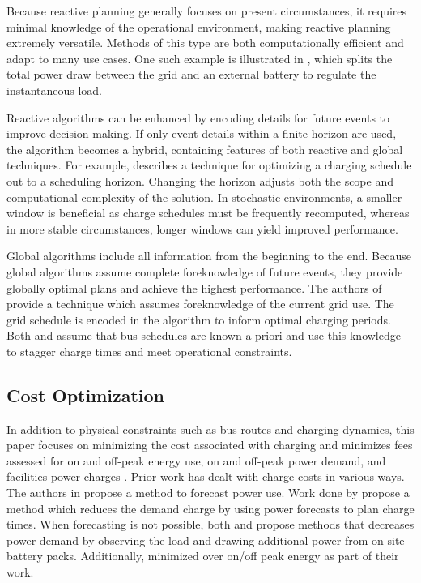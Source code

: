 \par Because reactive planning generally focuses on present circumstances, it requires minimal knowledge of the operational environment, making reactive planning extremely versatile.  Methods of this type are both computationally efficient and adapt to many use cases.  One such example is illustrated in \cite{cheng_smart_2020}, which splits the total power draw between the grid and an external battery to regulate the instantaneous load.
\par Reactive algorithms can be enhanced by encoding details for future events to improve decision making. If only event details within a finite horizon are used, the algorithm becomes a hybrid, containing features of both reactive and global techniques. For example, \cite{bagherinezhad_spatio-temporal_2020} describes a technique for optimizing a charging schedule out to a scheduling horizon. Changing the horizon adjusts both the scope and computational complexity of the solution. In stochastic environments, a smaller window is beneficial as charge schedules must be frequently recomputed, whereas in more stable circumstances, longer windows can yield improved performance. 
\par Global algorithms include all information from the beginning to the end. Because global algorithms assume complete foreknowledge of future events, they provide globally optimal plans and achieve the highest performance. The authors of \cite{jahic_preemptive_2019} provide a technique which assumes foreknowledge of the current grid use. The grid schedule is encoded in the algorithm to inform optimal charging periods. Both \cite{whitaker_network_2021} and \cite{el-taweel_incorporation_2019} assume that bus schedules are known a priori and use this knowledge to stagger charge times and meet operational constraints.
\subsection{Cost Optimization}
In addition to physical constraints such as bus routes and charging dynamics, this paper focuses on minimizing the cost associated with charging and minimizes fees assessed for on and off-peak energy use, on and off-peak power demand, and facilities power charges \cite{noauthor_rocky_nodate}. Prior work has dealt with charge costs in various ways.  
The authors in \cite{gao_charging_2019} propose a method to forecast power use. Work done by \cite{qin_numerical_2016} propose a method which reduces the demand charge by using power forecasts to plan charge times\cite{gao_charging_2019}.  When forecasting is not possible, both \cite{ojer_development_2020} and \cite{cheng_smart_2020} propose methods that decreases power demand by observing the load and drawing additional power from on-site battery packs. Additionally, \cite{el-taweel_incorporation_2019} minimized over on/off peak energy as part of their work.

